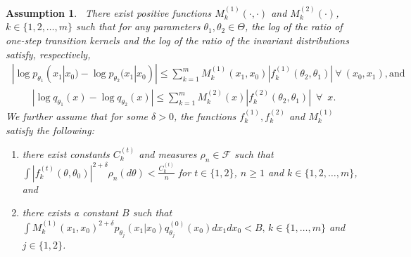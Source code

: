 \documentclass[11pt]{amsart}
\newtheorem{assumption}{Assumption}[section]
\begin{document}
\begin{assumption}~\label{assume:gen-lip}
 There exist positive functions $M^{(1)}_k(\cdot,\cdot)$ and $M^{(2)}_k(\cdot)$, $k \in \{1,2,\dots,m\}$ such that for any parameters $\theta_1,\theta_2 \in \Theta$, the log of the ratio of one-step transition kernels and the log of the ratio of the invariant distributions satisfy, respectively,
\begin{align}~\label{equation:lips_for_transition_probabilities}
       | \log p_{\theta_1}(x_1|x_0)-\log p_{\theta_2}(x_1|x_0) | \leq \sum_{k=1}^{m} M^{(1)}_k(x_1,x_0)|f^{(1)}_k(\theta_2,\theta_1)|~\forall~ (x_0,x_1), \text{and}
\end{align}
\begin{align}~\label{equation:lips_for_stationary_distribution}
    |\log q_{\theta_1}(x)-\log q_{\theta_2}(x)|\leq \sum_{k=1}^{m} M^{(2)}_k(x)|f^{(2)}_k(\theta_2,\theta_1)|\enspace\forall\enspace x.
\end{align}
We further assume that for some $\delta>0$, the functions $f^{(1)}_k, f^{(2)}_k$ and $M^{(1)}_k$ satisfy the following:
\begin{enumerate}[leftmargin=*,align=left]
    \item\label{assume:gen-lip(0)} there exist constants $C^{(t)}_k$ and measures $\rho_n \in \mathcal{F}$ such that $\int|f^{(t)}_k(\theta,\theta_0)|^{2+\delta}\rho_n(d\theta)<\frac{C_k^{(t)}}{n}$ for $t\in \{1,2\}$, $n\geq 1$ and $k\in \{1,2,\dots,m\}$, and
    \item there exists a constant $B$ such that $\int M^{(1)}_k(x_1,x_0)^{2+\delta}p_{\theta_j}(x_1|x_0)q_{\theta_j}^{(0)}(x_0)dx_1dx_0<B,\, k\in \{1,\dotsc,m\}$ and $j \in \{1,2\}$. 
\end{enumerate}
\end{assumption}
\end{document}
